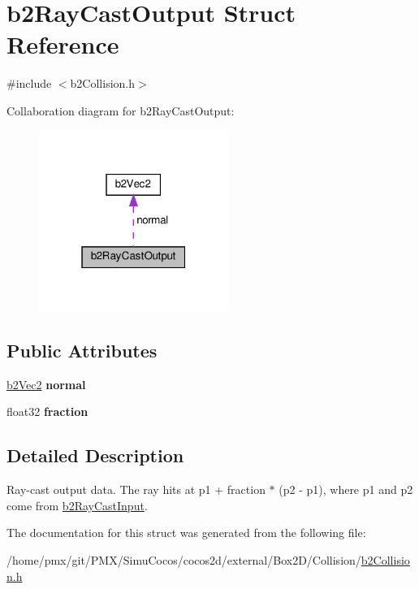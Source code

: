 \hypertarget{structb2RayCastOutput}{}\section{b2\+Ray\+Cast\+Output Struct Reference}
\label{structb2RayCastOutput}


{\ttfamily \#include $<$b2\+Collision.\+h$>$}



Collaboration diagram for b2\+Ray\+Cast\+Output\+:
\nopagebreak
\begin{figure}[H]
\begin{center}
\leavevmode
\includegraphics[width=175pt]{structb2RayCastOutput__coll__graph}
\end{center}
\end{figure}
\subsection*{Public Attributes}
\begin{DoxyCompactItemize}
\item 
\mbox{\label{structb2RayCastOutput_aa9bbfe75afa23c21e85cb1bd3736529b}} 
\hyperlink{structb2Vec2}{b2\+Vec2} {\bfseries normal}
\item 
\mbox{\label{structb2RayCastOutput_a191c69bb399304bfe30c69e2158b3f29}} 
float32 {\bfseries fraction}
\end{DoxyCompactItemize}


\subsection{Detailed Description}
Ray-\/cast output data. The ray hits at p1 + fraction $\ast$ (p2 -\/ p1), where p1 and p2 come from \hyperlink{structb2RayCastInput}{b2\+Ray\+Cast\+Input}. 

The documentation for this struct was generated from the following file\+:\begin{DoxyCompactItemize}
\item 
/home/pmx/git/\+P\+M\+X/\+Simu\+Cocos/cocos2d/external/\+Box2\+D/\+Collision/\hyperlink{cocos2d_2external_2Box2D_2Collision_2b2Collision_8h}{b2\+Collision.\+h}\end{DoxyCompactItemize}
